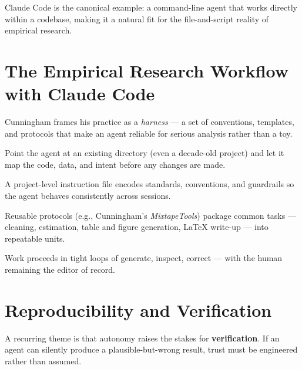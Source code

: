 \documentclass[11pt]{article}
\begin{document}
\noindent Claude Code is the canonical example: a command-line agent that works
directly within a codebase, making it a natural fit for the file-and-script
reality of empirical research.

\section{The Empirical Research Workflow with Claude Code}

Cunningham frames his practice as a \emph{harness} --- a set of conventions,
templates, and protocols that make an agent reliable for serious analysis
rather than a toy.

\begin{description}[style=nextline, leftmargin=1.5em]
  \item[Project onboarding] Point the agent at an existing directory (even a
        decade-old project) and let it map the code, data, and intent before
        any changes are made.
  \item[The \texttt{CLAUDE.md} convention] A project-level instruction file
        encodes standards, conventions, and guardrails so the agent behaves
        consistently across sessions.
  \item[Templates and skills] Reusable protocols (e.g., Cunningham's
        \emph{MixtapeTools}) package common tasks --- cleaning, estimation,
        table and figure generation, \LaTeX{} write-up --- into repeatable
        units.
  \item[Iterative review] Work proceeds in tight loops of generate, inspect,
        correct --- with the human remaining the editor of record.
\end{description}

\section{Reproducibility and Verification}

A recurring theme is that autonomy raises the stakes for \textbf{verification}.
If an agent can silently produce a plausible-but-wrong result, trust must be
engineered rather than assumed.
\end{document}

